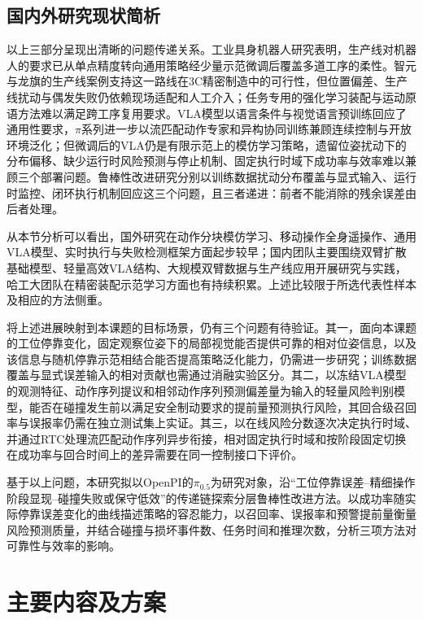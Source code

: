 \subsection{国内外研究现状简析}

以上三部分呈现出清晰的问题传递关系。工业具身机器人研究表明，生产线对机器人的要求已从单点精度转向通用策略经少量示范微调后覆盖多道工序的柔性。智元与龙旗的生产线案例支持这一路线在3C精密制造中的可行性，但位置偏差、生产线扰动与偶发失败仍依赖现场适配和人工介入；任务专用的强化学习装配与运动原语方法难以满足跨工序复用要求。VLA模型以语言条件与视觉语言预训练回应了通用性要求，\(\pi\)系列进一步以流匹配动作专家和异构协同训练兼顾连续控制与开放环境泛化；但微调后的VLA仍是有限示范上的模仿学习策略，遗留位姿扰动下的分布偏移、缺少运行时风险预测与停止机制、固定执行时域下成功率与效率难以兼顾三个部署问题。鲁棒性改进研究分别以训练数据扰动分布覆盖与显式输入、运行时监控、闭环执行机制回应这三个问题，且三者递进：前者不能消除的残余误差由后者处理。

从本节分析可以看出，国外研究在动作分块模仿学习、移动操作全身遥操作、通用VLA模型、实时执行与失败检测框架方面起步较早\cite{zhao2023act,fu2024mobilealoha,kim2024openvla,black2025rtc,xu2025faildetect}；国内团队主要围绕双臂扩散基础模型、轻量高效VLA结构、大规模双臂数据与生产线应用开展研究与实践\cite{liu2025rdt,wen2025tinyvla,bu2025univla,liu2024robomamba,agibot2025world}，哈工大团队在精密装配示范学习方面也有持续积累\cite{zang2023promp,ding2026ensemble}。上述比较限于所选代表性样本及相应的方法侧重。

将上述进展映射到本课题的目标场景，仍有三个问题有待验证。其一，面向本课题的工位停靠变化，固定观察位姿下的局部视觉能否提供可靠的相对位姿信息，以及该信息与随机停靠示范相结合能否提高策略泛化能力，仍需进一步研究；训练数据覆盖与显式误差输入的相对贡献也需通过消融实验区分。其二，以冻结VLA模型的观测特征、动作序列提议和相邻动作序列预测偏差量为输入的轻量风险判别模型，能否在碰撞发生前以满足安全制动要求的提前量预测执行风险，其回合级召回率与误报率仍需在独立测试集上实证。其三，以在线风险分数逐次决定执行时域、并通过RTC处理流匹配动作序列异步衔接，相对固定执行时域和按阶段固定切换在成功率与回合时间上的差异需要在同一控制接口下评价。

基于以上问题，本研究拟以OpenPI的\(\pi_{0.5}\)为研究对象，沿“工位停靠误差--精细操作阶段显现--碰撞失败或保守低效”的传递链探索分层鲁棒性改进方法。以成功率随实际停靠误差变化的曲线描述策略的容忍能力，以召回率、误报率和预警提前量衡量风险预测质量，并结合碰撞与损坏事件数、任务时间和推理次数，分析三项方法对可靠性与效率的影响。

\section{主要内容及方案}

